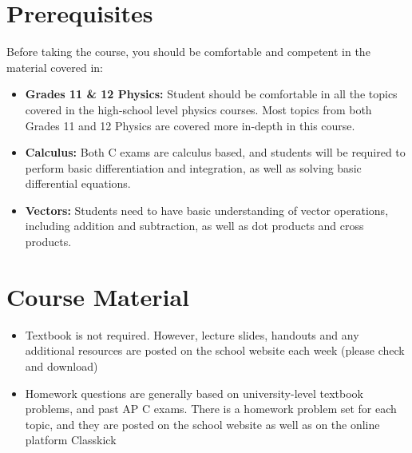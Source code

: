 \documentclass{../../oss-handout}
\begin{document}
\section*{Prerequisites}
Before taking the course, you should be comfortable and competent in the
material covered in:
\begin{itemize}[nosep,leftmargin=15pt]
\item\textbf{Grades 11 \& 12 Physics:} Student should be comfortable in all the
  topics covered in the high-school level physics courses. Most topics from
  both Grades 11 and 12 Physics are covered more in-depth in this course.
\item\textbf{Calculus:} Both C exams are calculus based, and students will be
  required to perform basic differentiation and integration, as well as solving
  basic differential equations.
\item\textbf{Vectors:} Students need to have basic understanding of vector
  operations, including addition and subtraction, as well as dot products and
  cross products.
\end{itemize}


\section*{Course Material}
\begin{itemize}[nosep,leftmargin=15pt]
\item Textbook is not required. However, lecture slides, handouts and any
  additional resources are posted on the school website each week (please check
  and download)
\item Homework questions are generally based on university-level textbook
  problems, and past AP C exams. There is a homework problem set for each
  topic, and they are posted on the school website as well as on the online
  platform Classkick
\end{itemize}
\end{document}
